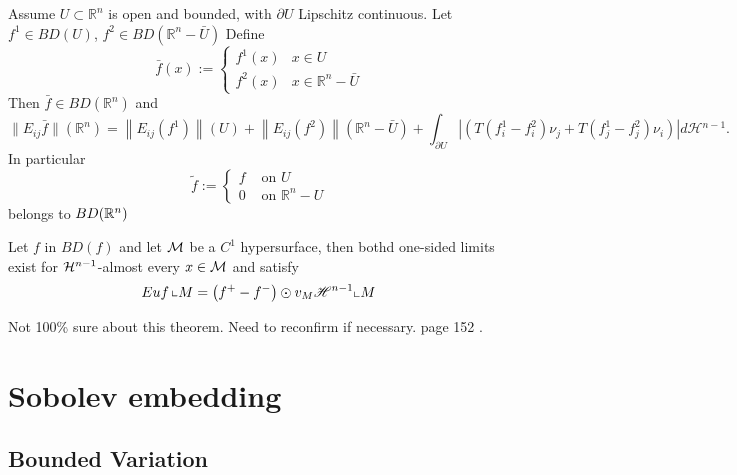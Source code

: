 \begin{theorem}
 Assume $U \subset \mathbb{R}^n$ is open and bounded, with $\partial U$ Lipschitz continuous. Let $f^1 \in B D(U)$, $f^2 \in B D\left(\mathbb{R}^n-\bar{U}\right)$
Define
$$
\bar{f}(x):= \begin{cases}f^1(x) & x \in U \\ f^2(x) & x \in \mathbb{R}^n-\bar{U}\end{cases}
$$
Then
$\bar{f} \in B D\left(\mathbb{R}^n\right)$
and
$$
\|E_{ij} \bar{f}\|\left(\mathbb{R}^n\right)=\left\|E_{ij} (f^1)\right\|(U)+\left\|E_{ij}( f^2)\right\|\left(\mathbb{R}^n-\bar{U}\right)+\int_{\partial U}\left|(T (f^1_i-f^2_i)\nu_j+T(f^1_j-f^2_j) \nu_i)\right| d \mathcal{H}{ }^{n-1} .
$$
In particular $$\tilde{f}:= \begin{cases}f & \text { on } U \\ 0 & \text { on } \mathbb{R}^n-U\end{cases}$$
belongs to $BD(\mathbb{R}^n)$
\end{theorem}

\begin{theorem}
Let $f$ in $BD(f)$ and let ${\mathcal M}$ be a $C^1$ hypersurface, then bothd one-sided limits exist for ${\mathcal H}^{n-1}$-almost every $x\in {\mathcal M}$ and satisfy
$$E uf\left\llcorner M=\left(f^{+}-f^{-}\right) \odot v_M \mathscr{H}^{n-1}\llcorner M\right.$$
\end{theorem}
\begin{question}
Not 100\% sure about this theorem. Need to reconfirm if necessary. page 152 \cite{RogerBook}.
\end{question}

\section{Sobolev embedding}
\subsection{Bounded Variation}

